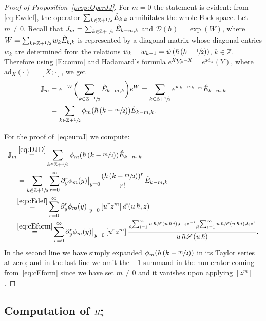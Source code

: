 \documentclass[JEP,XML,SOM,Unicode,NoEqCountersInSection,NoFloatCountersInSection]{cedram}
\let\mathcal\mathscr
\newcommand{\sbullet}{{\scriptscriptstyle\bullet}}
\newcommand{\csbullet}{{\raisebox{1pt}{$\sbullet$}}}
\theoremstyle{plain}
\theoremstyle{definition}
\theoremstyle{remark}
\newcommand{\Z}{\mathbb{Z}}
\newcommand{\cS}{\mathcal{S}}
\newcommand{\cE}{\mathcal{E}}
\newcommand{\Hd}{H^\csbullet}
\newcommand{\euro}{\mathbb{J}}
\begin{document}
\begin{proof}[Proof of Proposition~\ref{prop:OperJJ}] For $m=0$ the statement is evident: from \eqref{eq:Ewdef}, the operator $\sum_{k\in\Z+\sfrac{1}{2}}\hat E_{k,k}$ annihilates the whole Fock space. Let $m\neq 0$. Recall that $J_m=\sum_{k\in\Z+\sfrac{1}{2}}\hat{E}_{k-m,k}$ and
$
\mathcal{D}(\hbar)=\exp(W)
$,
where $W=\sum_{k\in \Z+\sfrac{1}{2}}w_k \hat E_{k,k}$ is represented by a diagonal matrix whose diagonal entries $w_k$ are determined from the relations
$w_{k}-w_{k-1}=\psi\left(\hbar\,(k-\sfrac{1}{2})\right)$, $k\in\Z$.
Therefore
using \eqref{E:comm} and Hadamard's formula $e^XY e^{-X} = e^{\mathrm{ad}_X}(Y)$, where $\mathrm{ad}_X(\cdot) =[X;\cdot]$, we get
\begin{align*}
\euro_m & =e^{-W}\biggl(\sum_{k\in\Z+\sfrac{1}{2}}\hat{E}_{k-m,k}\biggr) e^{W}
=\sum_{k\in\Z+\sfrac{1}{2}}e^{w_k-w_{k-m}}\hat{E}_{k-m,k}
\\
& =\sum_{k\in\Z+\sfrac{1}{2}}\phi_m(\hbar\,(k-\sfrac m2))\hat{E}_{k-m,k}.
\end{align*}

For the proof of~\eqref{eq:euroJ} we compute:
\begin{align*}
\euro_m
&\mathop{=}^{\eqref{eq:DJD}}
\sum_{k\in\Z+\sfrac{1}{2}}\phi_m(\hbar\,(k-\sfrac m2))\hat{E}_{k-m,k}
\\
&=
\sum_{k\in\Z+\sfrac{1}{2}}\sum_{r=0}^\infty\partial_y^r\phi_m(y)\big|_{y=0}
\frac{(\hbar\,(k-\sfrac m2))^r}{r!}\hat{E}_{k-m,k}
\\
&\!\mathop{=}^{\eqref{eq:cEdef}}
\sum_{r=0}^\infty\partial_y^r\phi_m(y)\big|_{y=0}\,[u^rz^m]\,\cE(u\,\hbar,z)
\\
&\!\mathop{=}^{\eqref{eq:cEform}}
\sum_{r=0}^\infty\partial_y^r\phi_m(y)\big|_{y=0}\,[u^rz^m]\,
\frac{
e^{\sum_{i=1}^\infty u\,\hbar\cS(u\,\hbar\,i) J_{-i}z^{-i}}
e^{\sum_{i=1}^\infty u\,\hbar \cS(u\,\hbar\,i) J_{i}z^{i}}}
{u\,\hbar\cS(u\,\hbar)}.
\end{align*}
In the second line we have simply expanded $\phi_m(\hbar\,(k-\sfrac m2))$ in its Taylor series at zero; and in the last line we omit the $-1$ summand in the numerator coming from~\eqref{eq:cEform} since we have set $m\neq 0$ and it vanishes upon applying $[z^m]$.
\end{proof}

\subsection{Computation of \texorpdfstring{$\Hd_n$}{Hn disconnected}}
\end{document}
